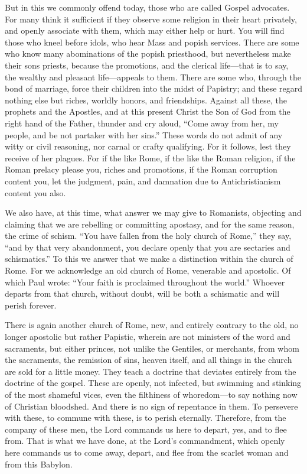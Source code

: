 But in this we commonly offend today, those who are called Gospel advocates. For many think it sufficient if they observe some religion in their heart privately, and openly associate with them, which may either help or hurt. You will find those who kneel before idols, who hear Mass and popish services. There are some who know many abominations of the popish priesthood, but nevertheless make their sons priests, because the promotions, and the clerical life—that is to say, the wealthy and pleasant life—appeals to them. There are some who, through the bond of marriage, force their children into the midst of Papistry; and these regard nothing else but riches, worldly honors, and friendships. Against all these, the prophets and the Apostles, and at this present Christ the Son of God from the right hand of the Father, thunder and cry aloud, “Come away from her, my people, and be not partaker with her sins.” These words do not admit of any witty or civil reasoning, nor carnal or crafty qualifying. For it follows, lest they receive of her plagues. For if the like Rome, if the like the Roman religion, if the Roman prelacy please you, riches and promotions, if the Roman corruption content you, let the judgment, pain, and damnation due to Antichristianism content you also.

We also have, at this time, what answer we may give to Romanists, objecting and claiming that we are rebelling or committing apostasy, and for the same reason, the crime of schism. “You have fallen from the holy church of Rome,” they say, “and by that very abandonment, you declare openly that you are sectaries and schismatics.” To this we answer that we make a distinction within the church of Rome. For we acknowledge an old church of Rome, venerable and apostolic. Of which Paul wrote: “Your faith is proclaimed throughout the world.” Whoever departs from that church, without doubt, will be both a schismatic and will perish forever.

There is again another church of Rome, new, and entirely contrary to the old, no longer apostolic but rather Papistic, wherein are not ministers of the word and sacraments, but either princes, not unlike the Gentiles, or merchants, from whom the sacraments, the remission of sins, heaven itself, and all things in the church are sold for a little money. They teach a doctrine that deviates entirely from the doctrine of the gospel. These are openly, not infected, but swimming and stinking of the most shameful vices, even the filthiness of whoredom—to say nothing now of Christian bloodshed. And there is no sign of repentance in them. To persevere with these, to commune with these, is to perish eternally. Therefore, from the company of these men, the Lord commands us here to depart, yes, and to flee from. That is what we have done, at the Lord’s commandment, which openly here commands us to come away, depart, and flee from the scarlet woman and from this Babylon.

